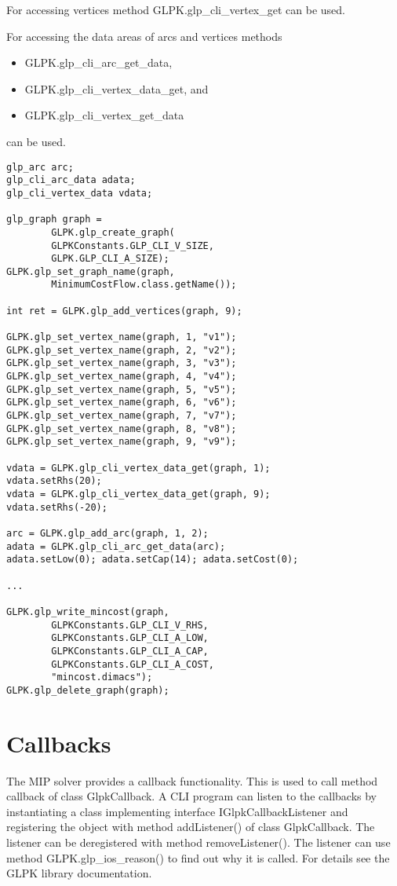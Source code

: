 \documentclass[a4paper,11pt]{report}
\begin{document}
For accessing vertices method GLPK.glp\_cli\_vertex\_get can be used.

For accessing the data areas of arcs and vertices methods
\begin{itemize}
\item GLPK.glp\_cli\_arc\_get\_data,
\item GLPK.glp\_cli\_vertex\_data\_get, and
\item GLPK.glp\_cli\_vertex\_get\_data
\end{itemize}
can be used.

\begin{lstlisting}
glp_arc arc;
glp_cli_arc_data adata;
glp_cli_vertex_data vdata;

glp_graph graph =
        GLPK.glp_create_graph(
        GLPKConstants.GLP_CLI_V_SIZE,
        GLPK.GLP_CLI_A_SIZE);
GLPK.glp_set_graph_name(graph,
        MinimumCostFlow.class.getName());

int ret = GLPK.glp_add_vertices(graph, 9);

GLPK.glp_set_vertex_name(graph, 1, "v1");
GLPK.glp_set_vertex_name(graph, 2, "v2");
GLPK.glp_set_vertex_name(graph, 3, "v3");
GLPK.glp_set_vertex_name(graph, 4, "v4");
GLPK.glp_set_vertex_name(graph, 5, "v5");
GLPK.glp_set_vertex_name(graph, 6, "v6");
GLPK.glp_set_vertex_name(graph, 7, "v7");
GLPK.glp_set_vertex_name(graph, 8, "v8");
GLPK.glp_set_vertex_name(graph, 9, "v9");

vdata = GLPK.glp_cli_vertex_data_get(graph, 1);
vdata.setRhs(20);
vdata = GLPK.glp_cli_vertex_data_get(graph, 9);
vdata.setRhs(-20);

arc = GLPK.glp_add_arc(graph, 1, 2);
adata = GLPK.glp_cli_arc_get_data(arc);
adata.setLow(0); adata.setCap(14); adata.setCost(0);

...

GLPK.glp_write_mincost(graph,
        GLPKConstants.GLP_CLI_V_RHS,
        GLPKConstants.GLP_CLI_A_LOW,
        GLPKConstants.GLP_CLI_A_CAP,
        GLPKConstants.GLP_CLI_A_COST,
        "mincost.dimacs");
GLPK.glp_delete_graph(graph);

\end{lstlisting}

\section{Callbacks}
The MIP solver provides a callback functionality. This is used to call
method callback of class GlpkCallback. A CLI program can listen to the
callbacks by instantiating a class implementing interface
IGlpkCallbackListener and registering the object with method addListener()
of class GlpkCallback. The listener can be deregistered with method
removeListener(). The listener can use method GLPK.glp\_ios\_reason() to find
out why it is called. For details see the GLPK library documentation.
\end{document}
